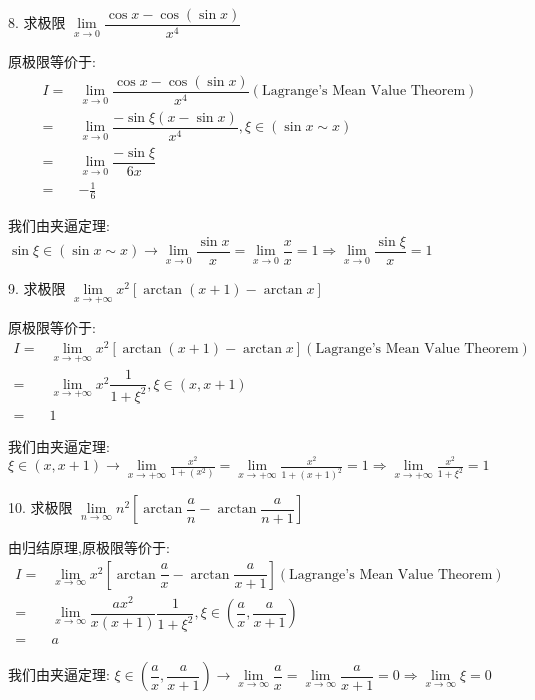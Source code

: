 8. 求极限 $\lim\limits_{x\to 0}\dfrac{\cos x-\cos(\sin x)}{x^{4}}$
\begin{solution}
	
	原极限等价于:
	\begin{align*}
		I = & \lim\limits_{x\to 0}\dfrac{\cos x-\cos(\sin x)}{x^{4}} (\text{Lagrange's Mean Value Theorem})\\
		  = & \lim\limits_{x\to 0}\dfrac{-\sin \xi(x-\sin x)}{x^{4}}, \xi\in (\sin x\sim x)\\
		  = & \lim\limits_{x\to 0}\dfrac{-\sin \xi}{6x}\\
		  = & -\frac{1}{6}
	\end{align*}

	我们由夹逼定理: $\sin \xi \in (\sin x\sim x)\to \lim\limits_{x\to 0}\dfrac{\sin x}{x} = \lim\limits_{x\to 0}\dfrac{x}{x}=1\Rightarrow \lim\limits_{x\to 0}\dfrac{\sin \xi}{x} = 1$

\end{solution}

9. 求极限 $\lim\limits_{x\to +\infty}x^{2}[\arctan(x+1)-\arctan x]$
\begin{solution}
	
	原极限等价于:
	\begin{align*}
		I = & \lim\limits_{x\to +\infty}x^{2}[\arctan(x+1)-\arctan x](\text{Lagrange's Mean Value Theorem})\\
		  = & \lim\limits_{x\to +\infty}x^{2}\dfrac{1}{1+\xi^{2}},\xi\in(x,x+1)\\
		  = & 1
	\end{align*}

	我们由夹逼定理: $\xi\in (x, x+1)\to \lim\limits_{x\to +\infty}\frac{x^{2}}{1+(x^{2})} = \lim\limits_{x\to +\infty}\frac{x^{2}}{1+(x+1)^{2}}=1\Rightarrow \lim\limits_{x\to +\infty}\frac{x^{2}}{1+\xi^{2}} = 1$
\end{solution}

10. 求极限 $\lim\limits_{n\to \infty}n^{2}[\arctan\dfrac{a}{n}-\arctan \dfrac{a}{n+1}]$
\begin{solution}
	
	由归结原理,原极限等价于:
	\begin{align*}
		I = & \lim\limits_{x\to \infty}x^{2}[\arctan\dfrac{a}{x}-\arctan \dfrac{a}{x+1}](\text{Lagrange's Mean Value Theorem})\\
		  = & \lim\limits_{x\to \infty}\dfrac{ax^{2}}{x(x+1)}\dfrac{1}{1+\xi^{2}},\xi\in(\dfrac{a}{x},\dfrac{a}{x+1})\\
		  = & a
	\end{align*}

	我们由夹逼定理: $\xi\in (\dfrac{a}{x},\dfrac{a}{x+1})\to \lim\limits_{x\to \infty}\dfrac{a}{x} = \lim\limits_{x\to \infty}\dfrac{a}{x+1}=0\Rightarrow \lim\limits_{x\to \infty}\xi = 0$
\end{solution}

